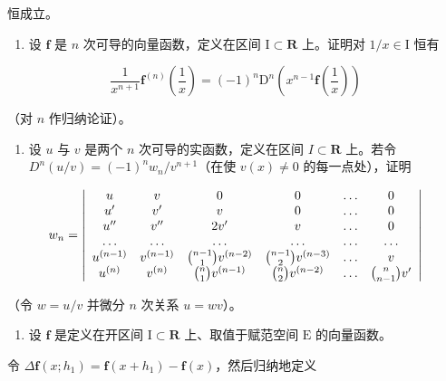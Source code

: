 恒成立。

\begin{enumerate}
\def\labelenumi{\arabic{enumi})}
\setcounter{enumi}{3}
\tightlist
\item
  设 \(\mathbf{f}\) 是 \(n\) 次可导的向量函数，定义在区间 \(\mathrm{I} \subset \mathbf{R}\) 上。证明对 \(1 / x \in \mathrm{I}\) 恒有
\end{enumerate}

\[
\frac {1}{x ^ {n + 1}} \mathbf {f} ^ {(n)} \left(\frac {1}{x}\right) = (- 1) ^ {n} \mathrm{D} ^ {n} \left(x ^ {n - 1} \mathbf {f} \left(\frac {1}{x}\right)\right)
\]

（对 \(n\) 作归纳论证）。

\begin{enumerate}
\def\labelenumi{\arabic{enumi})}
\setcounter{enumi}{4}
\tightlist
\item
  设 \(u\) 与 \(v\) 是两个 \(n\) 次可导的实函数，定义在区间 \(I \subset \mathbf{R}\) 上。若令 \(D^n(u / v) = (-1)^n w_n / v^{n+1}\)（在使 \(v(x) \neq 0\) 的每一点处），证明
\end{enumerate}

\[
w _ {n} = \left| \begin{array}{c c c c c c} u & v & 0 & 0 & \dots & 0 \\ u ^ {\prime} & v ^ {\prime} & v & 0 & \dots & 0 \\ u ^ {\prime \prime} & v ^ {\prime \prime} & 2 v ^ {\prime} & v & \dots & 0 \\ \dots & \dots & \dots & \dots & \dots & \dots \\ u ^ {(n - 1)} & v ^ {(n - 1)} & \binom {n - 1} {1} v ^ {(n - 2)} & \binom {n - 1} {2} v ^ {(n - 3)} & \dots & v \\ u ^ {(n)} & v ^ {(n)} & \binom {n} {1} v ^ {(n - 1)} & \binom {n} {2} v ^ {(n - 2)} & \dots & \binom {n} {n - 1} v ^ {\prime} \end{array} \right|
\]

（令 \(w = u / v\) 并微分 \(n\) 次关系 \(u = wv\)）。

\begin{enumerate}
\def\labelenumi{\arabic{enumi})}
\setcounter{enumi}{5}
\tightlist
\item
  设 \(\mathbf{f}\) 是定义在开区间 \(\mathrm{I} \subset \mathbf{R}\) 上、取值于赋范空间 \(\mathrm{E}\) 的向量函数。
\end{enumerate}

令 \(\Delta \mathbf{f}(x; h_1) = \mathbf{f}(x + h_1) - \mathbf{f}(x)\)，然后归纳地定义


